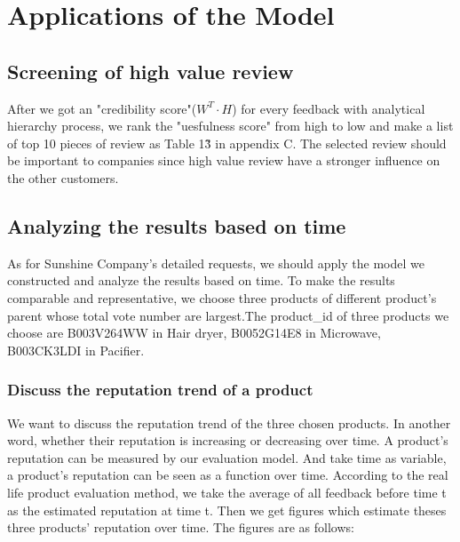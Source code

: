\documentclass{mcmthesis}
\begin{document}
\section{Applications of the Model}
\subsection{Screening of high value review}
After we got an "credibility score"($W^T \cdot H$) for every feedback with analytical hierarchy process, we rank the "uesfulness score" from high to low and make a list of top 10 pieces of review as Table 1\~3 in appendix C. The selected review should be important to companies since high value review have a stronger influence on the other customers. 




\subsection{Analyzing the results based on time}
As for Sunshine Company's detailed requests, we should apply the model we constructed and analyze the results based on time. To make the results comparable and representative, we choose three products of different product's parent whose total vote number are largest.The product\_id of three products we choose are B003V264WW in Hair dryer, B0052G14E8 in Microwave, B003CK3LDI in Pacifier.
\subsubsection{Discuss the reputation trend of a product}
We want to discuss the reputation trend of the three chosen products. In another word, whether their reputation is increasing or decreasing over time. A product's reputation can be measured by our evaluation model. And take time as variable, a product's reputation can be seen as a function over time. According to the real life product evaluation method, we take the average of all feedback before time t as the estimated reputation at time t. Then we get figures which estimate theses three products' reputation over time. The figures are as follows:
\end{document}

